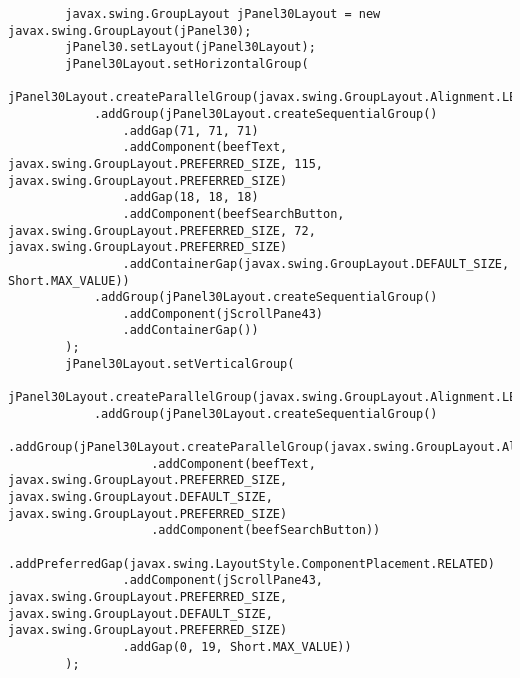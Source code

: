 \documentclass[12pt,a4paper]{article}
\begin{document}
\begin{lstlisting}
        javax.swing.GroupLayout jPanel30Layout = new javax.swing.GroupLayout(jPanel30);
        jPanel30.setLayout(jPanel30Layout);
        jPanel30Layout.setHorizontalGroup(
            jPanel30Layout.createParallelGroup(javax.swing.GroupLayout.Alignment.LEADING)
            .addGroup(jPanel30Layout.createSequentialGroup()
                .addGap(71, 71, 71)
                .addComponent(beefText, javax.swing.GroupLayout.PREFERRED_SIZE, 115, javax.swing.GroupLayout.PREFERRED_SIZE)
                .addGap(18, 18, 18)
                .addComponent(beefSearchButton, javax.swing.GroupLayout.PREFERRED_SIZE, 72, javax.swing.GroupLayout.PREFERRED_SIZE)
                .addContainerGap(javax.swing.GroupLayout.DEFAULT_SIZE, Short.MAX_VALUE))
            .addGroup(jPanel30Layout.createSequentialGroup()
                .addComponent(jScrollPane43)
                .addContainerGap())
        );
        jPanel30Layout.setVerticalGroup(
            jPanel30Layout.createParallelGroup(javax.swing.GroupLayout.Alignment.LEADING)
            .addGroup(jPanel30Layout.createSequentialGroup()
                .addGroup(jPanel30Layout.createParallelGroup(javax.swing.GroupLayout.Alignment.BASELINE)
                    .addComponent(beefText, javax.swing.GroupLayout.PREFERRED_SIZE, javax.swing.GroupLayout.DEFAULT_SIZE, javax.swing.GroupLayout.PREFERRED_SIZE)
                    .addComponent(beefSearchButton))
                .addPreferredGap(javax.swing.LayoutStyle.ComponentPlacement.RELATED)
                .addComponent(jScrollPane43, javax.swing.GroupLayout.PREFERRED_SIZE, javax.swing.GroupLayout.DEFAULT_SIZE, javax.swing.GroupLayout.PREFERRED_SIZE)
                .addGap(0, 19, Short.MAX_VALUE))
        );


\end{lstlisting}
\end{document}
